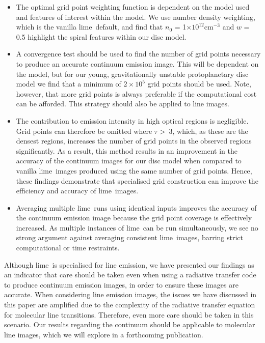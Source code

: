 \documentclass[fleqn,usenatbib]{mnras}
\newcommand{\lime}{{\sc lime}}
\begin{document}
\begin{itemize}[leftmargin=0.0cm, itemindent=1.0cm]

\item The optimal grid point weighting function is dependent on the model used and features of interest within the model. We use number density weighting, which is the vanilla \lime\ default, and find that $n_0$ = 1$\times10^{12}\mathrm{cm^{-3}}$ and $w$ = 0.5 highlight the spiral features within our disc model.

\item A convergence test should be used to find the number of grid points necessary to produce an accurate continuum emission image. This will be dependent on the model, but for our young, gravitationally unstable protoplanetary disc model we find that a minimum of $2\times10^5$ grid points should be used. Note, however, that more grid points is always preferable if the computational cost can be afforded. This strategy should also be applied to line images.

\item The contribution to emission intensity in high optical regions is negligible. Grid points can therefore be omitted where $\tau$ \textgreater\ 3, which, as these are the densest regions, increases the number of grid points in the observed regions significantly. As a result, this method results in an improvement in the accuracy of the continuum images for our disc model when compared to vanilla \lime\ images produced using the same number of grid points. Hence, these findings demonstrate that specialised grid construction can improve the efficiency and accuracy of \lime\ images.

\item Averaging multiple \lime\ runs using identical inputs improves the accuracy of the continuum emission image because the grid point coverage is effectively increased. As multiple instances of \lime\ can be run simultaneously, we see no strong argument against averaging consistent \lime\ images, barring strict computational or time restraints.

\end{itemize}

Although \lime\ is specialised for line emission, we have presented our findings as an indicator that care should be taken even when using a radiative transfer code to produce continuum emission images, in order to ensure these images are accurate. When considering line emission images, the issues we have discussed in this paper are amplified due to the complexity of the radiative transfer equation for molecular line transitions. Therefore, even more care should be taken in this scenario. Our results regarding the continuum should be applicable to molecular line images, which we will explore in a forthcoming publication.
\end{document}
